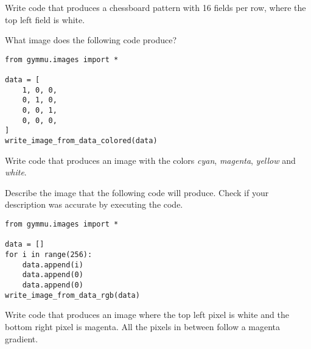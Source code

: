 \documentclass[11pt,a4paper]{report}
\begin{document}
\begin{ex}
Write code that produces a chessboard pattern with 16 fields per row, where the
top left field is white.
\end{ex}

\begin{ex}
What image does the following code produce?
\begin{lstlisting}
from gymmu.images import *

data = [
    1, 0, 0,
    0, 1, 0,
    0, 0, 1,
    0, 0, 0,
]
write_image_from_data_colored(data)
\end{lstlisting}
\end{ex}



\begin{ex}
Write code that produces an image with the colors \emph{cyan}, \emph{magenta},
\emph{yellow} and \emph{white}.
\end{ex}



\begin{ex}
Describe the image that the following code will produce. Check if your
description was accurate by executing the code.
\begin{lstlisting}
from gymmu.images import *

data = []
for i in range(256):
    data.append(i)
    data.append(0)
    data.append(0)
write_image_from_data_rgb(data)
\end{lstlisting}
\end{ex}



\begin{ex}
Write code that produces an image where the top left pixel is white and the
bottom right pixel is magenta. All the pixels in between follow a magenta
gradient.
\end{ex}
\end{document}
